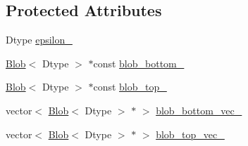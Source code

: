 \subsection*{Protected Attributes}
\begin{DoxyCompactItemize}
\item 
Dtype \hyperlink{classcaffe_1_1_l_r_n_layer_test_a9952e9353a5cb2c1155f17f315132f59}{epsilon\+\_\+}
\item 
\hyperlink{classcaffe_1_1_blob}{Blob}$<$ Dtype $>$ $\ast$const \hyperlink{classcaffe_1_1_l_r_n_layer_test_a14bf7b99347b9c3027faf75ea1a52ded}{blob\+\_\+bottom\+\_\+}
\item 
\hyperlink{classcaffe_1_1_blob}{Blob}$<$ Dtype $>$ $\ast$const \hyperlink{classcaffe_1_1_l_r_n_layer_test_a26ac20ad93eaec764e8595e84939964d}{blob\+\_\+top\+\_\+}
\item 
vector$<$ \hyperlink{classcaffe_1_1_blob}{Blob}$<$ Dtype $>$ $\ast$ $>$ \hyperlink{classcaffe_1_1_l_r_n_layer_test_a9c191aefd4a408d2a43035dd6015c1be}{blob\+\_\+bottom\+\_\+vec\+\_\+}
\item 
vector$<$ \hyperlink{classcaffe_1_1_blob}{Blob}$<$ Dtype $>$ $\ast$ $>$ \hyperlink{classcaffe_1_1_l_r_n_layer_test_aff3a0b8266c147b7922185b3153e7b68}{blob\+\_\+top\+\_\+vec\+\_\+}
\end{DoxyCompactItemize}


